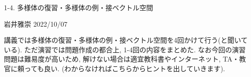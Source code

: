 \documentclass[dvipdfmx,a4paper,11pt]{article}
\newcommand{\R}{\mathbb{R}}
\theoremstyle{definition}
\newtheorem{dfn}[thm]{定義}
\begin{document}


\begin{center}
{\Large 1-4. 多様体の復習・多様体の例・接ベクトル空間}
\end{center}
\begin{flushright}
 岩井雅崇 2022/10/07
\end{flushright}

講義では多様体の復習・多様体の例・接ベクトル空間を4回かけて行う(と聞いている). ただ演習では問題作成の都合上, 1-4回の内容をまとめた. なお今回の演習問題は難易度が高いため, 解けない場合は適宜教科書やインターネット, TA・教官に頼っても良い. (わからなければこちらからヒントを出していきます).

\vspace{22pt}

\end{document}
